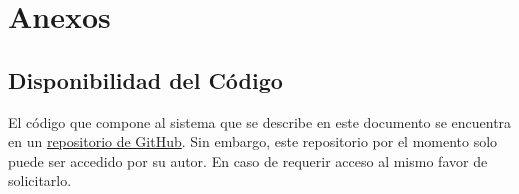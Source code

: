 \documentclass{scrreprt}
\begin{document}
\chapter{Anexos}

\section{Disponibilidad del Código}
El código que compone al sistema que se describe en este documento se encuentra en un \href{https://github.com/AlbanyArmenta0711/CSI_HAR_with_ESP32/tree/main/ESP32_Program/ESP_HAR}{repositorio de GitHub}. Sin embargo, este repositorio por el momento solo puede ser accedido por su autor. En caso de requerir acceso al mismo favor de solicitarlo.
\end{document}
